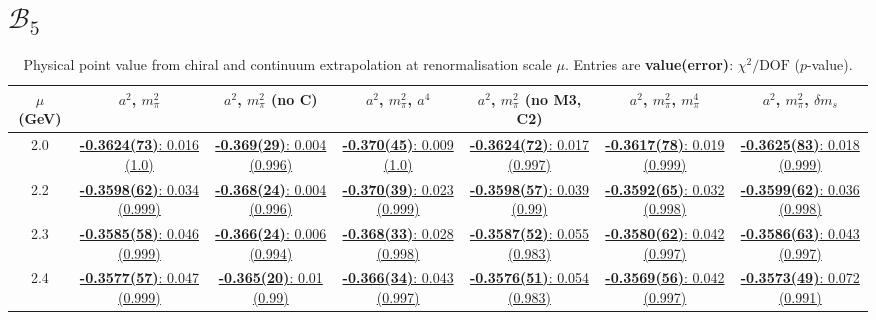 \documentclass[12pt]{extarticle}
\begin{document}
\section{$\mathcal{B}_5$}
\begin{table}[h!]
\begin{center}
\begin{tabular}{|c|c|c|c|c|c|c|}
\hline
$\mu$ (GeV) & $a^2$, $m_\pi^2$& $a^2$, $m_\pi^2$ (no C)& $a^2$, $m_\pi^2$, $a^4$& $a^2$, $m_\pi^2$ (no M3, C2)& $a^2$, $m_\pi^2$, $m_\pi^4$& $a^2$, $m_\pi^2$, $\delta m_s$\\
\hline
2.0& \hyperlink{TT/NPR/bag_a2m2_20.pdf.1}{\textbf{-0.3624(73)}: 0.016 (1.0)} & \hyperlink{TT/NPR/bag_a2m2noC_20.pdf.1}{\textbf{-0.369(29)}: 0.004 (0.996)} & \hyperlink{TT/NPR/bag_a2a4m2_20.pdf.1}{\textbf{-0.370(45)}: 0.009 (1.0)} & \hyperlink{TT/NPR/bag_a2m2mcut_20.pdf.1}{\textbf{-0.3624(72)}: 0.017 (0.997)} & \hyperlink{TT/NPR/bag_a2m2m4_20.pdf.1}{\textbf{-0.3617(78)}: 0.019 (0.999)} & \hyperlink{TT/NPR/bag_a2m2delm_20.pdf.1}{\textbf{-0.3625(83)}: 0.018 (0.999)}\\
2.2& \hyperlink{TT/NPR/bag_a2m2_22.pdf.1}{\textbf{-0.3598(62)}: 0.034 (0.999)} & \hyperlink{TT/NPR/bag_a2m2noC_22.pdf.1}{\textbf{-0.368(24)}: 0.004 (0.996)} & \hyperlink{TT/NPR/bag_a2a4m2_22.pdf.1}{\textbf{-0.370(39)}: 0.023 (0.999)} & \hyperlink{TT/NPR/bag_a2m2mcut_22.pdf.1}{\textbf{-0.3598(57)}: 0.039 (0.99)} & \hyperlink{TT/NPR/bag_a2m2m4_22.pdf.1}{\textbf{-0.3592(65)}: 0.032 (0.998)} & \hyperlink{TT/NPR/bag_a2m2delm_22.pdf.1}{\textbf{-0.3599(62)}: 0.036 (0.998)}\\
2.3& \hyperlink{TT/NPR/bag_a2m2_23.pdf.1}{\textbf{-0.3585(58)}: 0.046 (0.999)} & \hyperlink{TT/NPR/bag_a2m2noC_23.pdf.1}{\textbf{-0.366(24)}: 0.006 (0.994)} & \hyperlink{TT/NPR/bag_a2a4m2_23.pdf.1}{\textbf{-0.368(33)}: 0.028 (0.998)} & \hyperlink{TT/NPR/bag_a2m2mcut_23.pdf.1}{\textbf{-0.3587(52)}: 0.055 (0.983)} & \hyperlink{TT/NPR/bag_a2m2m4_23.pdf.1}{\textbf{-0.3580(62)}: 0.042 (0.997)} & \hyperlink{TT/NPR/bag_a2m2delm_23.pdf.1}{\textbf{-0.3586(63)}: 0.043 (0.997)}\\
2.4& \hyperlink{TT/NPR/bag_a2m2_24.pdf.1}{\textbf{-0.3577(57)}: 0.047 (0.999)} & \hyperlink{TT/NPR/bag_a2m2noC_24.pdf.1}{\textbf{-0.365(20)}: 0.01 (0.99)} & \hyperlink{TT/NPR/bag_a2a4m2_24.pdf.1}{\textbf{-0.366(34)}: 0.043 (0.997)} & \hyperlink{TT/NPR/bag_a2m2mcut_24.pdf.1}{\textbf{-0.3576(51)}: 0.054 (0.983)} & \hyperlink{TT/NPR/bag_a2m2m4_24.pdf.1}{\textbf{-0.3569(56)}: 0.042 (0.997)} & \hyperlink{TT/NPR/bag_a2m2delm_24.pdf.1}{\textbf{-0.3573(49)}: 0.072 (0.991)}\\
\hline
\end{tabular}
\caption{Physical point value from chiral and continuum extrapolation at renormalisation scale $\mu$. Entries are \textbf{value(error)}: $\chi^2/\text{DOF}$ ($p$-value).}
\end{center}
\end{table}
\end{document}
